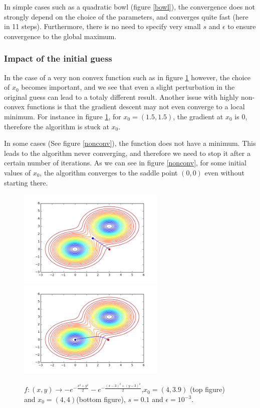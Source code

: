 In simple cases such as a quadratic bowl (figure \ref{bowl}), the convergence does not strongly depend on the choice of the parameters, and converges quite fast (here in 11 steps). Furthermore, there is no need to specify very small $s$ and $\epsilon$ to ensure convergence to the global maximum.

\subsubsection{Impact of the initial guess}

In the case of a very non convex function such as in figure \ref{normals} however, the choice of $x_0$ becomes important, and we see that even a slight perturbation in the original guess can lead to a totaly different result.
Another issue with highly non-convex functions is that the gradient descent may not even converge to a local minimum. For instance in figure \ref{normals}, for $x_0 = (1.5,1.5)$, the gradient at $x_0$ is $0$, therefore the algorithm is stuck at $x_0$.


In some cases (See figure \ref{nonconv}), the function does not have a minimum. This leads to the algorithm never converging, and therefore we need to stop it after a certain number of iterations. As we can see in figure \ref{nonconv}, for some initial values of $x_0$, the algorithm converges to the saddle point $(0,0)$ even without starting there.

\begin{figure}[h!]
  \centering
 \includegraphics[width=7cm]{../Figures/Q1/normals.png}
  \includegraphics[width=7cm]{../Figures/Q1/normals2.png}
\caption{$f : (x,y) \to -e^{-\frac{x^2 + y^2}{2}} - e^{-\frac{(x-3)^2 + (y-3)^2}{2}}$,$x_0 = (4,3.9)$ (top figure) and $x_0 = (4,4)$(bottom figure), $s = 0.1$ and $\epsilon = 10^{-3}$.}
\label{normals}
\end{figure}



